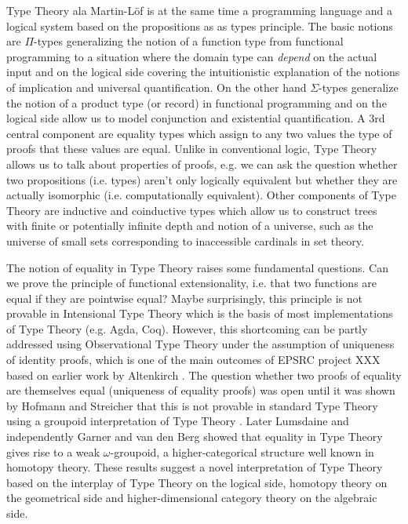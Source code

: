 \documentclass[twocolumn,a4paper,11pt]{article}
\begin{document}
{Type Theory ala Martin-L\"of is at the same time a programming
language and a logical system based on the propositions as as types
principle. The basic notions are $\Pi$-types generalizing the notion
of a function type from functional programming to a situation where
the domain type can \emph{depend} on the actual input and on the
logical side covering the intuitionistic  explanation of the notions of 
implication and universal quantification. On the other hand
$\Sigma$-types generalize the notion of a product type (or record) in
functional programming and on the logical side allow us to model
conjunction and existential quantification. A 3rd central component are
equality types which assign to any two values the type of proofs that 
these values are equal. Unlike in conventional logic, Type Theory
allows us to talk about properties of proofs, e.g. we can ask the
question whether two propositions (i.e. types) aren't only logically
equivalent but whether they are actually isomorphic
(i.e. computationally equivalent). Other components of Type Theory are
inductive and coinductive types which allow us to construct trees
with finite or potentially infinite depth and notion of a universe,
such as the universe of small sets corresponding to inaccessible
cardinals in set theory.

The notion of equality in Type Theory raises some fundamental questions. 
Can we prove the principle of functional extensionality, i.e. that two
functions are equal if they are pointwise equal? Maybe surprisingly,
this principle is not provable in Intensional Type Theory which is the
basis of most implementations of Type Theory (e.g. Agda,
Coq). However, this shortcoming can be partly addressed using
Observational Type Theory under the assumption of uniqueness of
identity proofs, which is one of the main outcomes of EPSRC project
XXX based on earlier work by Altenkirch \cite{altenkirch:extSetoids}.
The question whether two proofs of equality are themselves equal
(uniqueness of equality proofs) was open until it was shown by Hofmann
and Streicher that this is not provable in standard Type Theory using
a groupoid interpretation of Type Theory
\cite{hofmannStreicher:groupoids}. Later Lumsdaine and independently
Garner and van den Berg
\cite{lumsdaine:omegaCatsFromTT,bergGarner:typesAreWeakOG} showed that
equality in Type Theory gives rise to a weak $\omega$-groupoid, a
higher-categorical structure well known in homotopy theory. These
results suggest a novel interpretation of Type Theory based on the
interplay of Type Theory on the logical side, homotopy theory on the
geometrical side and higher-dimensional category theory on the
algebraic side.

}
\end{document}
